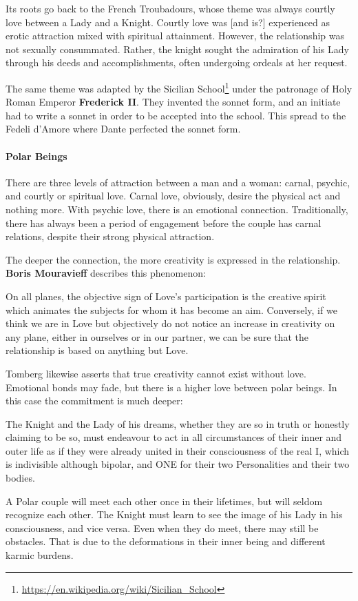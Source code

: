 Its roots go back to the French Troubadours, whose theme was always courtly love between a Lady and a Knight. Courtly love was [and is?] experienced as erotic attraction mixed with spiritual attainment. However, the relationship was not sexually consummated. Rather, the knight sought the admiration of his Lady through his deeds and accomplishments, often undergoing ordeals at her request.

The same theme was adapted by the Sicilian School\footnote{\url{https://en.wikipedia.org/wiki/Sicilian_School}} under the patronage of Holy Roman Emperor \textbf{Frederick II}. They invented the sonnet form, and an initiate had to write a sonnet in order to be accepted into the school. This spread to the Fedeli d'Amore where Dante perfected the sonnet form.

\paragraph{Polar Beings}
There are three levels of attraction between a man and a woman: carnal, psychic, and courtly or spiritual love. Carnal love, obviously, desire the physical act and nothing more. With psychic love, there is an emotional connection. Traditionally, there has always been a period of engagement before the couple has carnal relations, despite their strong physical attraction.

The deeper the connection, the more creativity is expressed in the relationship. \textbf{Boris Mouravieff} describes this phenomenon:

\begin{quotex}
On all planes, the objective sign of Love's participation is the creative spirit which animates the subjects for whom it has become an aim. Conversely, if we think we are in Love but objectively do not notice an increase in creativity on any plane, either in ourselves or in our partner, we can be sure that the relationship is based on anything but Love. 

\end{quotex}
Tomberg likewise asserts that true creativity cannot exist without love. Emotional bonds may fade, but there is a higher love between polar beings. In this case the commitment is much deeper:

\begin{quotex}
The Knight and the Lady of his dreams, whether they are so in truth or honestly claiming to be so, must endeavour to act in all circumstances of their inner and outer life as if they were already united in their consciousness of the real I, which is indivisible although bipolar, and ONE for their two Personalities and their two bodies. 

\end{quotex}
A Polar couple will meet each other once in their lifetimes, but will seldom recognize each other. The Knight must learn to see the image of his Lady in his consciousness, and vice versa. Even when they do meet, there may still be obstacles. That is due to the deformations in their inner being and different karmic burdens.

